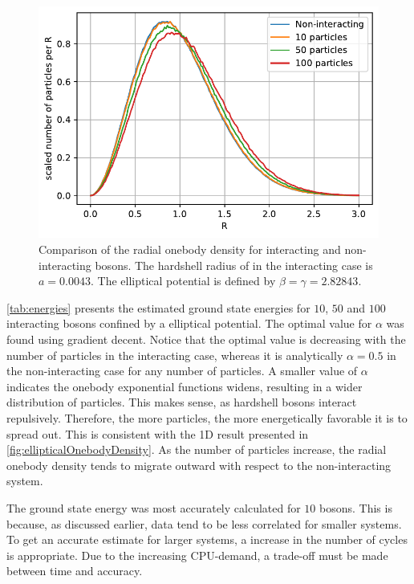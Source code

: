 \begin{figure}
	\includegraphics[width=.8\linewidth]{figures/density_all.pdf}	
	\centering
	\caption{Comparison of the radial onebody density for interacting and non-interacting bosons. The hardshell radius of in the interacting case is $a = 0.0043$. The elliptical potential is defined by $\beta = \gamma =  2.82843$. }
	\label{fig:ellipticalOnebodyDensity}
\end{figure}

\autoref{tab:energies} presents the estimated ground state energies for $10$,
$50$ and $100$ interacting bosons confined by a elliptical potential. The
optimal value for $\alpha$ was found using gradient decent. Notice that the
optimal value is decreasing with the number of particles in the interacting
case, whereas it is analytically $\alpha = 0.5$ in the non-interacting case for
any number of particles. A smaller value of $\alpha$ indicates the onebody
exponential functions widens, resulting in a wider distribution of particles.
This makes sense, as hardshell bosons interact repulsively. Therefore, the more
particles, the more energetically favorable it is to spread out. This is
consistent with the 1D result presented in
\autoref{fig:ellipticalOnebodyDensity}. As the number of particles increase, the
radial onebody density tends to migrate outward with respect to the
non-interacting system.


The ground state energy was most accurately calculated for $10$ bosons. This is
because, as discussed earlier, data tend to be less correlated for smaller
systems. To get an accurate estimate for larger systems, a increase in the number
of cycles is appropriate. Due to the increasing CPU-demand, a trade-off must be
made between time and accuracy.


